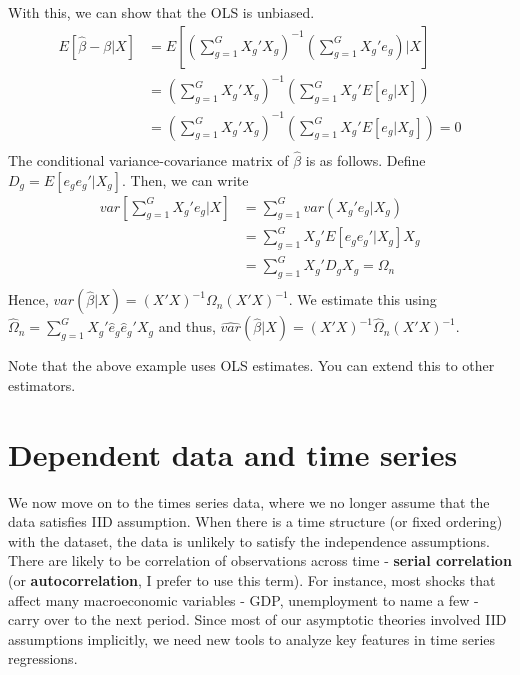 \documentclass[12pt]{article}
\theoremstyle{definition}
\theoremstyle{property}
\theoremstyle{assumption}
\theoremstyle{example}
\theoremstyle{comment}
\begin{document}
With this, we can show that the OLS is unbiased. 
\[
\begin{aligned}
E[\hat{\beta}-\beta|X] &= E\left[\left(\sum_{g=1}^G X_g'X_g\right)^{-1}\left(\sum_{g=1}^G X_g'e_g\right) |X \right]\\
&=\left(\sum_{g=1}^G X_g'X_g\right)^{-1}\left(\sum_{g=1}^G X_g'E[e_g|X]\right)\\
&=\left(\sum_{g=1}^G X_g'X_g\right)^{-1}\left(\sum_{g=1}^G X_g'E[e_g|X_g]\right)=0\\
\end{aligned}
\]
The conditional variance-covariance matrix of $\hat{\beta}$ is as follows. Define $D_g=E[e_ge_g'|X_g]$. Then, we can write
\[
\begin{aligned}
var\left[\sum_{g=1}^G X_g'e_g |X\right]&=\sum_{g=1}^G var(X_g'e_g|X_g)\\
&=\sum_{g=1}^G X_g'E[e_ge_g'|X_g]X_g\\
&=\sum_{g=1}^G X_g'D_gX_g=\Omega_n\\
\end{aligned}
\]
Hence, $var(\hat{\beta}|X)=(X'X)^{-1}\Omega_n(X'X)^{-1}$. We estimate this using  $\widehat{\Omega}_n=\sum_{g=1}^G X_g'\hat{e}_g\hat{e}_g'X_g$ and thus, $\widehat{var}(\hat{\beta}|X)=(X'X)^{-1}\widehat{\Omega}_n(X'X)^{-1}$.
\par
Note that the above example uses OLS estimates. You can extend this to other estimators. 

\section{Dependent data and time series}
We now move on to the times series data, where we no longer assume that the data satisfies IID assumption. When there is a time structure (or fixed ordering) with the dataset, the data is unlikely to satisfy the independence assumptions. There are likely to be correlation of observations across time - \textbf{serial correlation} (or \textbf{autocorrelation}, I prefer to use this term). For instance, most shocks that affect many macroeconomic variables - GDP, unemployment to name a few - carry over to the next period. Since most of our asymptotic theories involved IID assumptions implicitly, we need new tools to analyze key features in time series regressions. 
\end{document}
